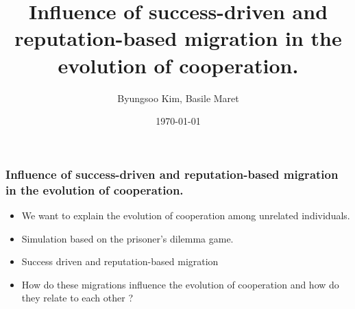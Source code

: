 \documentclass{beamer}
\title[MSSSM]{Influence of success-driven and reputation-based migration in the evolution of cooperation.}
\author{Byungsoo Kim, Basile Maret} %
\date{\today} %
\begin{document}
\begin{frame}
\frametitle{Influence of success-driven and reputation-based migration in the evolution of cooperation.}
\begin{itemize}
\item We want to explain the evolution of cooperation among unrelated individuals.
\item<2-> Simulation based on the prisoner's dilemma game.
\item<3-> Success driven and reputation-based migration
\item<4-> How do these migrations influence the evolution of cooperation and how do they relate to each other ?

\end{itemize}
\end{frame}
\end{document}
